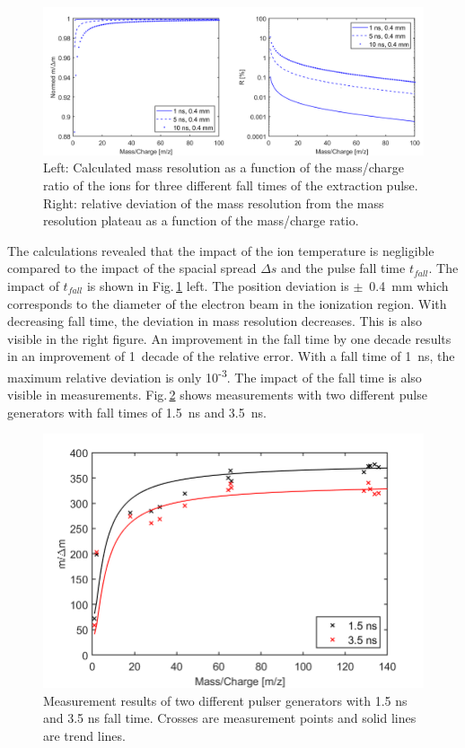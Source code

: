 	\begin{figure}[H] %
		\centering
		\includegraphics[width=\textwidth]{Bilder/PulseSimMassRes_Norm.png}
		\caption{Left: Calculated mass resolution as a function of the mass/charge ratio of the ions for three different fall times of the extraction pulse. Right: relative deviation of the mass resolution from the mass resolution plateau as a function of the mass/charge ratio.}
		\label{fig:Simtfall}
	\end{figure}
	The calculations revealed that the impact of the ion temperature is negligible compared to the impact of the spacial spread $\Delta s$ and the pulse fall time $t_{fall}$. The impact of $t_{fall}$ is shown in Fig.\,\ref{fig:Simtfall} left. The position deviation is $\pm$~0.4~mm which corresponds to the diameter of the electron beam in the ionization region. With decreasing fall time, the deviation in mass resolution decreases. This is also visible in the right figure. An improvement in the fall time by one decade results in an improvement of 1~decade of the relative error. With a fall time of 1~ns, the maximum relative deviation is only 10\textsuperscript{-3}. The impact of the fall time is also visible in measurements. Fig.\,\ref{fig:LabWLE} shows measurements with two different pulse generators with fall times of 1.5~ns and 3.5~ns.
	\begin{figure}[H] %
		\centering
		\includegraphics[width=.8\textwidth]{Bilder/PulseLabWLEm480.png}
		\caption{Measurement results of two different pulser generators with 1.5 ns and 3.5 ns fall time. Crosses are measurement points and solid lines are trend lines.}
		\label{fig:LabWLE}
	\end{figure}
